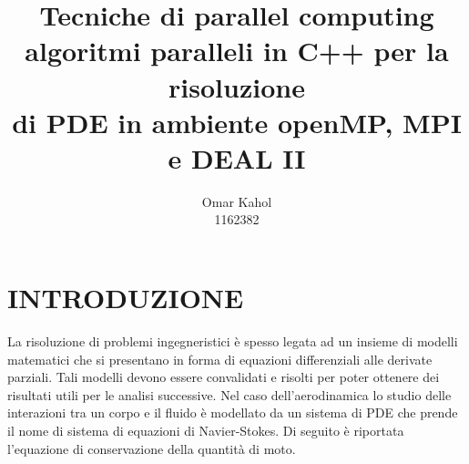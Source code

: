 \documentclass[italian]{article}
\title{%
  \textbf{Tecniche di parallel computing} \\
  \large algoritmi paralleli in C++ per la risoluzione \\
    di PDE in ambiente openMP, MPI e DEAL II}
\date{}
\author{Omar Kahol\\1162382}
\begin{document}
\noindent{}
\newpage
\justifying

\section{INTRODUZIONE}
La risoluzione di problemi ingegneristici è spesso legata ad un insieme di modelli matematici che si presentano in forma di equazioni differenziali alle derivate parziali. Tali modelli devono essere convalidati e risolti per poter ottenere dei risultati utili per le analisi successive. Nel caso dell’aerodinamica lo studio delle interazioni tra un corpo e il fluido è modellato da un sistema di PDE che prende il nome di sistema di equazioni di Navier-Stokes. Di seguito è riportata l’equazione di conservazione della quantità di moto.
\end{document}
